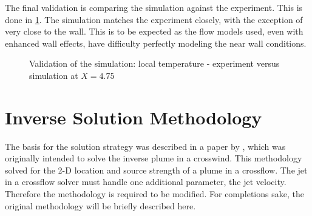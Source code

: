 \documentclass[preprint,12pt]{elsarticle}
\begin{document}
%	

The final validation is comparing the simulation against the experiment.  This is done in \cref{fig:jetexp15}.  The simulation matches the experiment closely, with the exception of very close to the wall.  This is to be expected as the flow models used, even with enhanced wall effects, have difficulty perfectly modeling the near wall conditions.
\begin{figure}[!htbp]
	\centering
	\setlength\figureheight{5cm} 
	\setlength\figurewidth{5cm}
	
	\caption{Validation of the simulation: local temperature - experiment versus simulation at $X=4.75$}
	\label{fig:jetexp15}
\end{figure}

\section{Inverse Solution Methodology}
The basis for the solution strategy was described in a paper by \citet{ijhmt1}, which was originally intended to solve the inverse plume in a crosswind.  This methodology solved for the 2-D location and source strength of a plume in a crossflow.  The jet in a crossflow solver must handle one additional parameter, the jet velocity.  Therefore the methodology is required to be modified.  For completions sake, the original methodology will be briefly described here.
\end{document}
